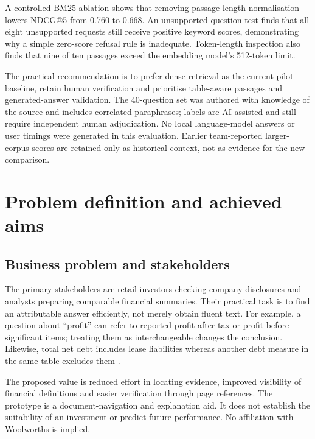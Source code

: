 \documentclass[11pt,a4paper]{article}
\begin{document}
A controlled BM25 ablation shows that removing passage-length normalisation lowers NDCG@5 from 0.760 to 0.668. An unsupported-question test finds that all eight unsupported requests still receive positive keyword scores, demonstrating why a simple zero-score refusal rule is inadequate. Token-length inspection also finds that nine of ten passages exceed the embedding model's 512-token limit.

The practical recommendation is to prefer dense retrieval as the current pilot baseline, retain human verification and prioritise table-aware passages and generated-answer validation. The 40-question set was authored with knowledge of the source and includes correlated paraphrases; labels are AI-assisted and still require independent human adjudication. No local language-model answers or user timings were generated in this evaluation. Earlier team-reported larger-corpus scores are retained only as historical context, not as evidence for the new comparison.

\section{Problem definition and achieved aims}
\subsection{Business problem and stakeholders}
The primary stakeholders are retail investors checking company disclosures and analysts preparing comparable financial summaries. Their practical task is to find an attributable answer efficiently, not merely obtain fluent text. For example, a question about ``profit'' can refer to reported profit after tax or profit before significant items; treating them as interchangeable changes the conclusion. Likewise, total net debt includes lease liabilities whereas another debt measure in the same table excludes them \cite{summary}.

The proposed value is reduced effort in locating evidence, improved visibility of financial definitions and easier verification through page references. The prototype is a document-navigation and explanation aid. It does not establish the suitability of an investment or predict future performance. No affiliation with Woolworths is implied.
\end{document}
